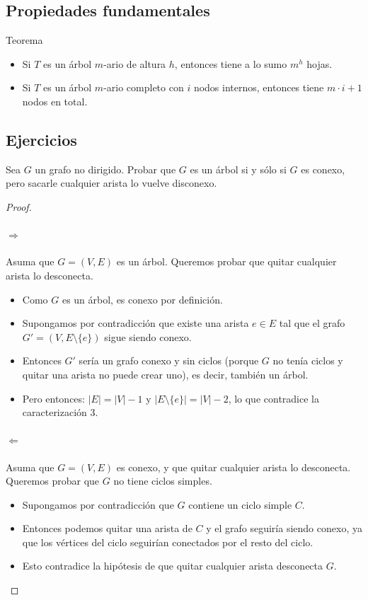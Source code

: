 \subsection*{Propiedades fundamentales}
\begin{exampleblock}{Teorema}
\begin{itemize}
  \item Si $T$ es un árbol $m$-ario de altura $h$, entonces tiene a lo sumo $m^h$ hojas.
  \item Si $T$ es un árbol $m$-ario completo con $i$ nodos internos, entonces tiene $m \cdot i + 1$ nodos en total.
\end{itemize}
\end{exampleblock}

\subsection*{Ejercicios}

 Sea $G$ un grafo no dirigido. Probar que $G$ es un árbol si y sólo si $G$ es conexo, pero sacarle cualquier arista lo vuelve disconexo.
\begin{proof}
\leavevmode

\paragraph{\( \Rightarrow \)}
Asuma que $G = (V, E)$ es un árbol. Queremos probar que quitar cualquier arista lo desconecta.

\begin{itemize}
  \item Como $G$ es un árbol, es conexo por definición.
  \item Supongamos por contradicción que existe una arista $e \in E$ tal que el grafo $G' = (V, E \setminus \{e\})$ sigue siendo conexo.
  \item Entonces $G'$ sería un grafo conexo y sin ciclos (porque $G$ no tenía ciclos y quitar una arista no puede crear uno), es decir, también un árbol.
  \item Pero entonces: $|E| = |V| - 1$ y $|E \setminus \{e\}| = |V| - 2$, lo que contradice la caracterización 3.
\end{itemize}

\paragraph{ \( \Leftarrow \)}
Asuma que $G = (V, E)$ es conexo, y que quitar cualquier arista lo desconecta. Queremos probar que $G$ no tiene ciclos simples.

\begin{itemize}
  \item Supongamos por contradicción que $G$ contiene un ciclo simple $C$.
  \item Entonces podemos quitar una arista de $C$ y el grafo seguiría siendo conexo, ya que los vértices del ciclo seguirían conectados por el resto del ciclo.
  \item Esto contradice la hipótesis de que quitar cualquier arista desconecta $G$.
\end{itemize}

\end{proof}

